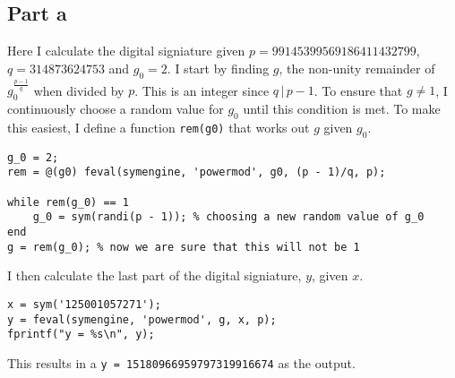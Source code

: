 \documentclass[11pt]{article}
\begin{document}
\subsection*{Part a}
Here I calculate the digital signiature given $p = 99145399569186411432799$, $q = 314873624753$ and $g_0 = 2$. I start by finding $g$, the non-unity remainder of $g_0^\frac{p-1}{q}$ when divided by $p$. This is an integer since $q \, | \, p - 1$. To ensure that $g \neq 1$, I continuously choose a random value for $g_0$ until this condition is met. To make this easiest, I define a function \texttt{rem(g0)} that works out $g$ given $g_0$.
\begin{Verbatim}[xleftmargin=0.5in]
g_0 = 2;
rem = @(g0) feval(symengine, 'powermod', g0, (p - 1)/q, p);

while rem(g_0) == 1
    g_0 = sym(randi(p - 1)); % choosing a new random value of g_0 
end
g = rem(g_0); % now we are sure that this will not be 1
\end{Verbatim}
I then calculate the last part of the digital signiature, $y$, given $x$.
\begin{Verbatim}[xleftmargin=0.5in]
x = sym('125001057271');
y = feval(symengine, 'powermod', g, x, p);
fprintf("y = %s\n", y);
\end{Verbatim}
This results in a \texttt{y = 15180966959797319916674} as the output.
\end{document}
